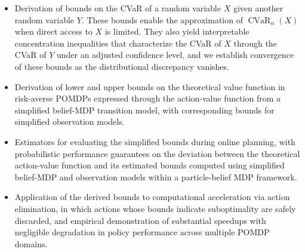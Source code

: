 \documentclass[acmlarge, manuscript, screen, review, natbib=false, oneside]{acmart}
\DeclareMathOperator{\CVaR}{CVaR}
\begin{document}
\begin{itemize}
	\item Derivation of bounds on the CVaR of a random variable $X$ given another random variable $Y$. These bounds enable the approximation of $\CVaR_\alpha(X)$ when direct access to $X$ is limited. They also yield interpretable concentration inequalities that characterize the CVaR of $X$ through the CVaR of $Y$ under an adjusted confidence level, and we establish convergence of these bounds as the distributional discrepancy vanishes.
	
	\item Derivation of lower and upper bounds on the theoretical value function in risk-averse POMDPs expressed through the action-value function from a simplified belief-MDP transition model, with corresponding bounds for simplified observation models.
	
	\item Estimators for evaluating the simplified bounds during online planning, with probabilistic performance guarantees on the deviation between the theoretical action-value function and its estimated bounds computed using simplified belief-MDP and observation models within a particle-belief MDP framework.

	\item Application of the derived bounds to computational acceleration via action elimination, in which actions whose bounds indicate suboptimality are safely discarded, and empirical demonstration of substantial speedups with negligible degradation in policy performance across multiple POMDP domains.
\end{itemize}
\end{document}
